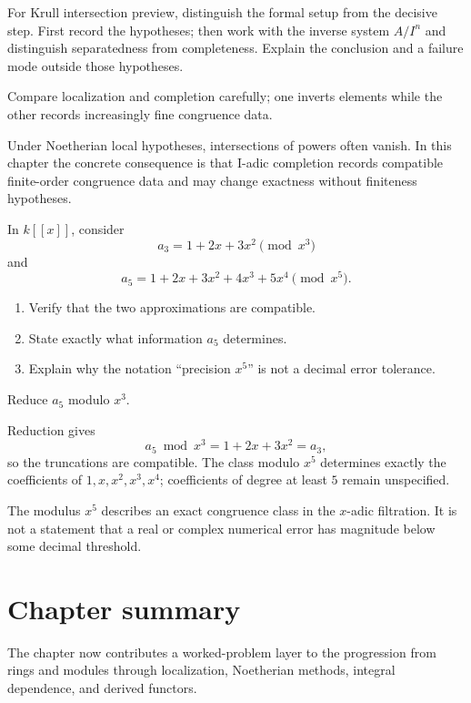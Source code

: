 \begin{exercise}\label{exr:v18-08}
For Krull intersection preview, distinguish the formal setup from the decisive step. First record the hypotheses; then work with the inverse system \(A/I^n\) and distinguish separatedness from completeness. Explain the conclusion and a failure mode outside those hypotheses.
\end{exercise}
\begin{hint}
Compare localization and completion carefully; one inverts elements while the other records increasingly fine congruence data.
\end{hint}
\begin{solution}
Under Noetherian local hypotheses, intersections of powers often vanish. In this chapter the concrete consequence is that I-adic completion records compatible finite-order congruence data and may change exactness without finiteness hypotheses.
\end{solution}

\begin{exercise}\label{exr:v18-exact-iadic-01}
In \(k[[x]]\), consider
\[
a_3=1+2x+3x^2\pmod{x^3}
\]
and
\[
a_5=1+2x+3x^2+4x^3+5x^4\pmod{x^5}.
\]

\begin{enumerate}
\item Verify that the two approximations are compatible.
\item State exactly what information \(a_5\) determines.
\item Explain why the notation ``precision \(x^5\)'' is not a decimal error
tolerance.
\end{enumerate}
\end{exercise}
\begin{hint}
Reduce \(a_5\) modulo \(x^3\).
\end{hint}
\begin{solution}
Reduction gives
\[
a_5\bmod x^3
=
1+2x+3x^2
=
a_3,
\]
so the truncations are compatible.  The class modulo \(x^5\) determines
exactly the coefficients of \(1,x,x^2,x^3,x^4\); coefficients of degree at
least \(5\) remain unspecified.

The modulus \(x^5\) describes an exact congruence class in the \(x\)-adic
filtration.  It is not a statement that a real or complex numerical error has
magnitude below some decimal threshold.
\end{solution}

\section*{Chapter summary}
The chapter now contributes a worked-problem layer to the progression from rings and modules through localization, Noetherian methods, integral dependence, and derived functors.

